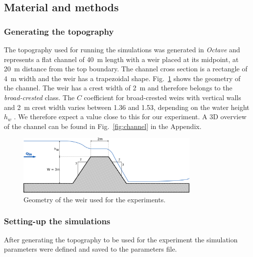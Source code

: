 \subsection{Material and methods}
\subsubsection{Generating the topography}
The topography used for running the simulations was generated in \textit{Octave}  and represents a flat channel of \SI{40}{\meter} length with a weir placed at its midpoint, at \SI{20}{\meter} distance from the top boundary.
The channel cross section is a rectangle of \SI{4}{\meter} width and the weir has a trapezoidal shape.
Fig.~\ref{fig:weir_scheme} shows the geometry of the channel.
The weir has a crest width of \SI{2}{\meter} and therefore belongs to the \emph{broad-crested} class. The $C$ coefficient for broad-crested weirs with vertical walls and \SI{2}{\meter} crest width varies between \num{1.36} and \num{1.53}, depending on the water height $h_w$ \autocite{brown_urban_2009}.
We therefore expect a value close to this for our experiment.
A 3D overview of the channel can be found in Fig.~\ref{fig:channel} in the Appendix. 

\begin{figure}[h]
  \centering
  \includegraphics[width=0.8\textwidth]{Figures/weir_scheme.png}
  \caption{Geometry of the weir used for the experiments.}
  \label{fig:weir_scheme}
\end{figure}

\subsubsection{Setting-up the simulations}
After generating the topography to be used for the experiment the simulation parameters were defined and saved to the parameters file.

